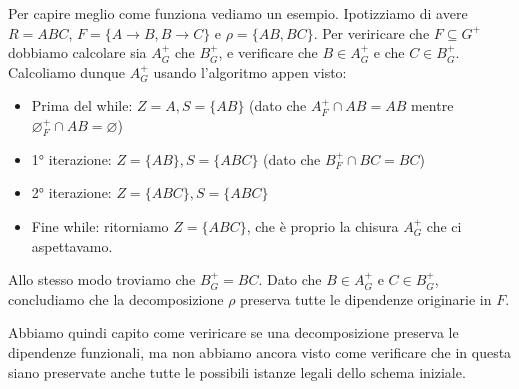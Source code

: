\documentclass[11pt, a4paper, titlepage, oneside]{scrbook}
\begin{document}
Per capire meglio come funziona vediamo un esempio. Ipotizziamo di avere $R = ABC$, $F = \{A \longrightarrow B, B \longrightarrow C\}$ e $\rho = \{AB,BC\}$. Per veriricare che $F \subseteq G^+$ dobbiamo calcolare sia $A^+_G$ che $B^+_G$, e verificare che $B \in A^+_G$ e che $C \in B^+_G$. Calcoliamo dunque $A^+_G$ usando l'algoritmo appen visto:
\begin{itemize}
    \item Prima del while: $Z = A, S = \{AB\}$ (dato che $A_F^+ \cap AB = AB$ mentre $\varnothing_F^+ \cap AB = \varnothing$)
    \item 1° iterazione: $Z = \{AB\}, S = \{ABC\}$ (dato che $B_F^+ \cap BC = BC$)
    \item 2° iterazione: $Z = \{ABC\}, S = \{ABC\}$
    \item Fine while: ritorniamo $Z = \{ABC\}$, che è proprio la chisura $A_G^+$ che ci aspettavamo.
\end{itemize}

Allo stesso modo troviamo che $B_G^+ = BC$. Dato che $B \in A^+_G$ e $C \in B^+_G$, concludiamo che la decomposizione $\rho$ preserva tutte le dipendenze originarie in $F$. 

Abbiamo quindi capito come veriricare se una decomposizione preserva le dipendenze funzionali, ma non abbiamo ancora visto come verificare che in questa siano preservate anche tutte le possibili istanze legali dello schema iniziale. 
\end{document}
